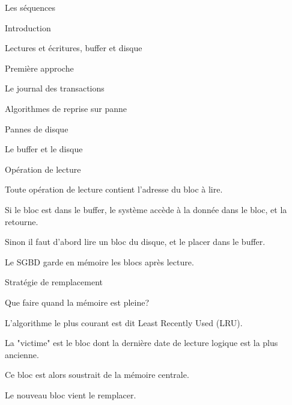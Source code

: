 \documentclass[aspectratio=169, handout]{beamer} %
\begin{document}
\begin{frame}{Les séquences}

		
\begin{redlist}

  \item Introduction

  \item \alert{Lectures et écritures, buffer et disque}
  
  \item Première approche

  \item Le journal des transactions

  \item Algorithmes de reprise sur panne

  \item Pannes de disque

\end{redlist}

\end{frame}



\begin{frame}{Le buffer et le disque}


\end{frame}

\begin{frame}{Opération de lecture}

Toute opération de lecture contient l'adresse du bloc à lire. 

\vfill

 Si le bloc est dans  le buffer, le système accède à la donnée dans le bloc,  et la retourne.

\vfill

Sinon il faut d'abord lire un bloc du disque, et le placer dans le buffer.

\vfill

Le SGBD garde en mémoire
les blocs après lecture.

\end{frame}


\begin{frame}{Stratégie de remplacement}


Que faire quand la mémoire est pleine?

\vfill

L'algorithme le plus courant est dit Least Recently Used (LRU).

\begin{redbullet}
  \item  La "victime" est le bloc dont la dernière date de lecture logique est la plus ancienne. 
  \item Ce bloc est alors soustrait de la mémoire centrale.
  \item  Le nouveau bloc vient le remplacer.
\end{redbullet}

\vfill

\end{frame}
\end{document}
